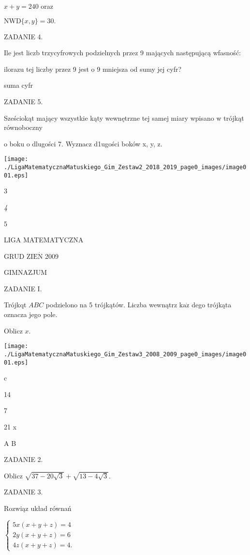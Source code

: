 \documentclass[a4paper,12pt]{article}
\begin{document}
$x+y=240$ oraz

$\mathrm{N}\mathrm{W}\mathrm{D}\{x,y\}=30.$

ZADANIE 4.

Ile jest liczb trzycyfrowych podzielnych przez 9 mających następującą wfasność:

ilorazu tej liczby przez 9 jest o 9 mniejsza od sumy jej cyfr?

suma cyfr

ZADANIE 5.

Sześciokąt mający wszystkie kąty wewnętrzne tej samej miary wpisano w trójkąt równoboczny

o boku o dlugości 7. Wyznacz d1ugości boków x, y, z.
\begin{center}
\texttt{[image: ./LigaMatematycznaMatuskiego\_Gim\_Zestaw2\_2018\_2019\_page0\_images/image001.eps]}
\end{center}
3

{\it 4}

5






LIGA MATEMATYCZNA

GRUD Z$\mathrm{I}\mathrm{E}\acute{\mathrm{N}}$ 2009

GIMNAZJUM

ZADANIE I.

Trójkqt $ABC$ podzielono na 5 trójkątów. Liczba wewnątrz $\mathrm{k}\mathrm{a}\dot{\mathrm{z}}$ dego trójkąta oznacza jego pole.

Oblicz $x.$
\begin{center}
\texttt{[image: ./LigaMatematycznaMatuskiego\_Gim\_Zestaw3\_2008\_2009\_page0\_images/image001.eps]}
\end{center}
c

14

7

21  x

A  B

ZADANIE 2.

Oblicz $\sqrt{37-20\sqrt{3}}+\sqrt{13-4\sqrt{3}}.$

ZADANIE 3.

Rozwiąz układ równań

$\left\{\begin{array}{l}
5x(x+y+z)=4\\
2y(x+y+z)=6\\
4z(x+y+z)=4.
\end{array}\right.$
\end{document}
